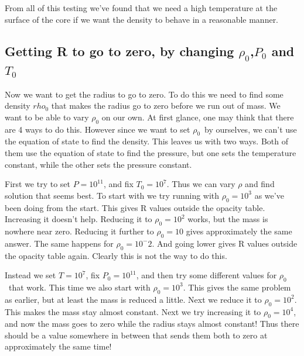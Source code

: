 \documentclass[a4paper,12pt]{article}
\begin{document}
From all of this testing we've found that we need a high temperature at the surface of the core if we want the density to behave in a reasonable manner.

\subsection{Getting R to go to zero, by changing $\rho_0$,$P_0$ and $T_0 $}
Now we want to get the radius to go to zero. To do this we need to find some density $rho_0$ that makes the radius go to zero before we run out of mass.
We want to be able to vary $\rho_0$ on our own.
At first glance, one may think that there are 4 ways to do this. However since we want to set $\rho_0$ by ourselves, we can't use the equation of state to find the density.
This leaves us with two ways. Both of them use the equation of state to find the pressure, but one sets the temperature constant, while the other sets the pressure constant.

First we try to set $P = 10^11$, and fix $T_0= 10^7$. Thus we can vary $\rho$ and find solution that seems best.
To start with we try running with $\rho_0 = 10^3$ as we've been doing from the start. This gives R values outside the opacity table. Increasing it doesn't help. 
Reducing it to $\rho_0 = 10^2$ works, but the mass is nowhere near zero. Reducing it further to $\rho_0 = 10$ gives approximately the same answer. 
The same happens for $\rho_0 = 10^-2$. And going lower gives R values outside the opacity table again. Clearly this is not the way to do this.

Instead we set $T = 10^7$, fix $P_0 = 10^11$, and then try some different values for $\rho_0$ that work.
This time we also start with $\rho_0 = 10^3$. This gives the same problem as earlier, but at least the mass is reduced a little. Next we reduce it to $\rho_0 = 10^2$. This makes the mass stay almost constant. Next we try increasing it to $\rho_0 = 10^4$, and now the mass goes to zero while the radius stays almost constant! Thus there should be a value somewhere in between that sends them both to zero at approximately the same time!
\end{document}
